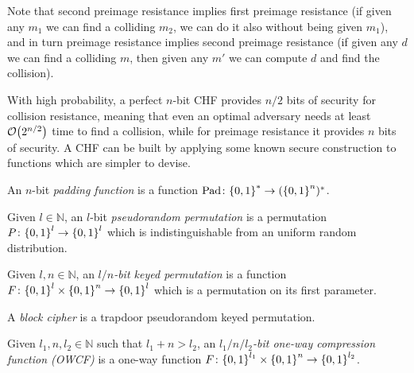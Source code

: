 Note that second preimage resistance implies first preimage resistance (if given any \(m_1\) 
we can find a colliding \(m_2\), we can do it also without being given \(m_1\)), and in turn 
preimage resistance implies second preimage resistance (if given any \(d\) we can find a colliding 
\(m\), then given any \(m'\) we can compute \(d\) and find the collision).

With high probability, a perfect \(n\)-bit CHF provides \(n/2\) bits of security
for collision resistance, meaning that even an optimal adversary needs at least \(\BigO{2^{n/2}}\) 
time to find a collision, while for preimage resistance it provides \(n\) bits of security.
A CHF can be built by applying some known secure construction to functions which are
simpler to devise.
\begin{definition}
	An \(n\)-bit \emph{padding function} is a function 
	\(\Pad\colon \Set{0, 1}^{*} \to \Parens{\Set{0, 1}^n}^{*}\).
\end{definition}
\begin{definition}
	Given \(l \in \mathbb{N}\), an \(l\)-bit \emph{pseudorandom permutation} is a permutation 
	\(P\colon \Set{0, 1}^l \to \Set{0, 1}^l\) which is indistinguishable from an uniform random 
	distribution.
\end{definition}
\begin{definition}
	Given \(l, n \in \mathbb{N}\), an \emph{\(l/n\)-bit keyed permutation} is
	a function \(F\colon \Set{0, 1}^l \times \Set{0, 1}^n \to \Set{0, 1}^l\) which is a permutation 
  on its first parameter.
\end{definition}
\begin{definition}
  A \emph{block cipher} is a trapdoor pseudorandom keyed permutation.
\end{definition}
\begin{definition}
	Given \(l_1, n, l_2 \in \mathbb{N}\) such that \(l_1 + n > l_2\), an 
	\emph{\(l_1/n/l_2\)-bit one-way compression function (OWCF)} is a one-way function 
	\(F\colon \Set{0, 1}^{l_1} \times \Set{0, 1}^{n} \to \Set{0, 1}^{l_2}\).
\end{definition}

